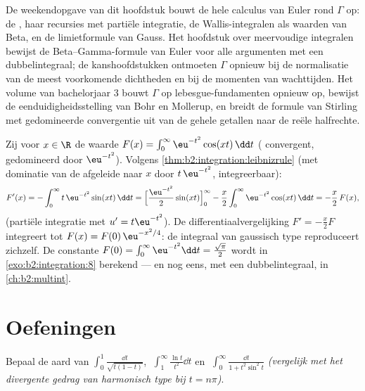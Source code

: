 \begin{remark}
De weekendopgave van dit hoofdstuk bouwt de hele calculus van
Euler rond $\Gamma$ op: de , haar recursies met
partiële integratie, de Wallis-integralen als waarden van Beta, en
de limietformule van Gauss. Het hoofdstuk over meervoudige
integralen bewijst de Beta--Gamma-formule van Euler voor alle
argumenten met een dubbelintegraal; de kanshoofdstukken ontmoeten
$\Gamma$ opnieuw bij de normalisatie van de meest voorkomende
dichtheden en bij de momenten van wachttijden. Het volume van
bachelorjaar 3 bouwt $\Gamma$ op lebesgue-fundamenten opnieuw op,
bewijst de eenduidigheidsstelling van Bohr en Mollerup, en breidt
de formule van Stirling met gedomineerde convergentie uit van de
gehele getallen naar de reële halfrechte.
\end{remark}

\begin{example}\label{ex:b2:integration:laplace}
Zij voor $x \in \R$ de waarde $F(x) = \int_0^{\infty}
\eu^{-t^2}\cos(xt)\,\dd t$ ( convergent, gedomineerd door
$\eu^{-t^2}$). Volgens
\cref{thm:b2:integration:leibnizrule} (met dominatie van de
afgeleide naar $x$ door $t\,\eu^{-t^2}$, integreerbaar):
\[
F'(x) = -\int_0^\infty t\,\eu^{-t^2}\sin(xt)\,\dd t
= \Bigl[\frac{\eu^{-t^2}}{2}\sin(xt)\Bigr]_0^\infty
- \frac x2\int_0^\infty \eu^{-t^2}\cos(xt)\,\dd t
= -\frac x2\,F(x),
\]
(partiële integratie met $u' = t\eu^{-t^2}$). De
differentiaalvergelijking $F' = -\frac x2 F$ integreert tot $F(x) =
F(0)\,\eu^{-x^2/4}$: de integraal van gaussisch type reproduceert
zichzelf. De constante $F(0) = \int_0^\infty \eu^{-t^2}\dd t =
\frac{\sqrt\pi}{2}$ wordt in \cref{exo:b2:integration:8} berekend
--- en nog eens, met een dubbelintegraal, in
\cref{ch:b2:multint}.
\end{example}

\section{Oefeningen}

\begin{exercise}[$\star$]\label{exo:b2:integration:1}
Bepaal de aard van $\displaystyle\int_0^1 \frac{\dd
t}{\sqrt{t(1-t)}}$, $\;\displaystyle\int_1^\infty \frac{\ln
t}{t^2}\dd t$ en $\;\displaystyle\int_0^\infty \frac{\dd t}{1 +
t^2\sin^2 t}$ \emph{(vergelijk met het divergente gedrag van
harmonisch type bij $t = n\pi$)}.
\end{exercise}

